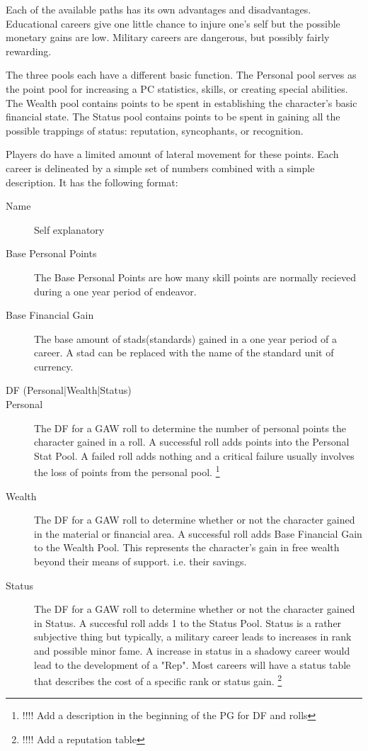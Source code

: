 Each of the available paths has its own advantages and disadvantages.
Educational careers give one little chance to injure one's self but the
possible monetary gains are low.  Military careers are dangerous, but
possibly fairly rewarding.

The three pools each have a different basic function.
The Personal pool serves as the point pool for
increasing a PC statistics, skills, or creating special abilities.
The Wealth pool contains points to be spent in establishing the
character's basic financial state.
The Status pool contains points to be spent in gaining all the
possible trappings of status: reputation, syncophants, or recognition.

Players do have a limited amount of lateral movement for these  points.
Each career is delineated by a simple set of numbers combined with a
simple description. It has the following format:

\begin{description}
	\item [Name]
	Self explanatory
    \item[Base Personal Points]
	The Base Personal Points are how many skill points are normally
	recieved during a one year period of endeavor.
	\item[Base Financial Gain]
	The base amount of stads(standards) gained in a one year period of 
	a career. A stad can be replaced with the name of the standard 
	unit of currency.

    \item[DF (Personal|Wealth|Status)]

        \item[Personal]
		The DF for a GAW roll to determine the number of personal points
		the character gained in a roll. A successful roll adds points into the 
		Personal Stat Pool. A failed roll adds nothing and a critical failure 
        usually involves the loss of points from the personal pool.  
        \footnote{!!!! Add a description in the beginning of the PG for
        DF and rolls}

        \item[Wealth] The DF for a GAW 
        roll to determine whether or not the character gained in the material 
        or financial area. A successful roll adds Base Financial Gain 
		to the Wealth Pool. This represents the character's gain in free 
		wealth beyond their means of support. i.e. their savings.

        \item[Status] The DF for a GAW 
        roll to determine whether or not the character gained in  
        Status. A succesful roll adds 1 to the Status Pool. 
		Status is a rather subjective thing but typically, a 
        military career leads to increases in rank and possible minor fame. A 
        increase in status in a shadowy career would lead to the development 
        of a "Rep".  Most careers will have a status table that describes 
        the cost of a specific rank or status gain. 
		\footnote{!!!! Add a reputation table}

\end{description}

